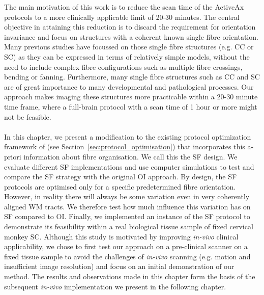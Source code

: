The main motivation of this work is to reduce the scan time of the ActiveAx protocols to a more clinically applicable limit of 20-30 minutes. The central objective in attaining this reduction is to discard the requirement for orientation invariance and focus on structures with a coherent known single fibre orientation. Many previous studies have focussed on those single fibre structures (e.g. \gls{CC} or \gls{SC}) as they can be expressed in terms of relatively simple models, without the need to include complex fibre configurations such as multiple fibre crossings, bending or fanning. Furthermore, many single fibre structures such as \gls{CC} and \gls{SC} are of great importance to many developmental and pathological processes. Our approach makes imaging these structures more practicable within a 20-30 minute time frame, where a full-brain protocol with a scan time of 1 hour or more might not be feasible.
\paragraph{}
In this chapter, we present a modification to the existing protocol optimization framework of \cite{Alexander:2008} (see Section~\ref{sec:protocol_optimisation}) that incorporates this a-priori information about fibre organisation. We call this the  \gls{SF} design. We evaluate different \gls{SF} implementations and use computer simulations to test and compare the \gls{SF} strategy with the original \gls{OI} approach. By design, the {\gls{SF}} protocols are optimised only for a specific predetermined fibre orientation. However, in reality there will always be some variation even in very coherently aligned \gls{WM} tracts. We therefore test how much influence this variation has on \gls{SF} compared to \gls{OI}. Finally, we implemented an instance of the {\gls{SF}} protocol to demonstrate its feasibility within a real biological tissue sample of fixed cervical monkey \gls{SC}. Although this study is motivated by improving \emph{in-vivo} clinical applicability, we chose to first test our approach on a pre-clinical scanner on a fixed tissue sample to avoid the challenges of \emph{in-vivo} scanning (e.g. motion and insufficient image resolution) and focus on an initial demonstration of our method. The results and observations made in this chapter form the basis of the subsequent \emph{in-vivo} implementation we present in the following chapter.

